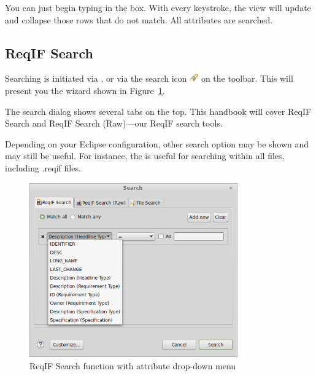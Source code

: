 You can just begin typing in the box.  With every keystroke, the view will update and collapse those rows that do not match.  All attributes are searched.

\subsection{ReqIF Search}

Searching is initiated via , or via the search icon \includegraphics[height=1em]{../rmf-images/icons/full/obj16/search.png} on the toolbar.  This will present you the wizard shown in Figure~\ref{fig:reqif_search}.

\begin{info}
The search dialog shows several tabs on the top.  This handbook will cover ReqIF Search and ReqIF Search (Raw)---our ReqIF search tools.  

Depending on your Eclipse configuration, other search option may be shown and may still be useful.  For instance, the  is useful for searching within all files, including .reqif files.
\end{info}

\begin{figure}
  \centering
  \includegraphics[width=0.8\textwidth]{../rmf-images/reqIF_search_1.png}
  \caption{ReqIF Search function with attribute drop-down menu}
  \label{fig:reqif_search}
\end{figure}
\label{sec:reqif_search}


